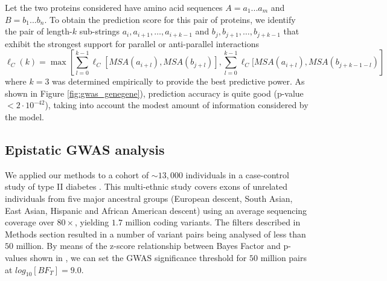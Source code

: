 \begin{figure}[p]
\begin{subfigure}[t]{.2\textwidth}
  \label{fig:sub2}
\end{subfigure}
\label{fig:gwas_jmol}
\end{figure}

Let the two proteins considered have amino acid sequences $A = a_1...a_m$ and $B = b_1...b_n$. 
To obtain the prediction score for this pair of proteins, we identify the pair of length-$k$ sub-strings $a_i, a_{i+1}, …, a_{i+k-1}$ and $b_j, b_{j+1}, …, b_{j+k-1}$ that exhibit the strongest support for parallel or anti-parallel interactions
\[
\ell_C(k) = \max\left[ \sum_{l=0}^{k-1}{ \ell_C[ MSA(a_{i+l}) , MSA(b_{j+l}) ]},  \sum_{l=0}^{k-1}{\ell_C[ MSA(a_{i+l}) , MSA(b_{j+k-1-l})} \right]
\]
\noindent where $k=3$ was determined empirically to provide the best predictive power. 
As shown in Figure \ref{fig:gwas_genegene}), prediction accuracy is quite good (p-value $< 2 \cdot 10^{-42}$), taking into account the modest amount of information considered by the model.

\subsection{Epistatic GWAS analysis}

We applied our methods to a cohort of $\sim 13,000$ individuals in a case-control study of type II diabetes \cite{mccarthy2015T2D}.
This multi-ethnic study covers exons of unrelated individuals from five major ancestral groups (European descent, South Asian, East Asian, Hispanic and African American descent) using an average sequencing coverage over $80 \times$, yielding $1.7$ million coding variants. 
The filters described in Methods section resulted in a number of variant pairs being analysed of less than $50$ million. 
By means of the z-score relationship between Bayes Factor and p-values shown in \cite{goodman1999toward}, we can set the GWAS significance threshold for $50$ million pairs at $log_{10}[BF_T] =  9.0$.

